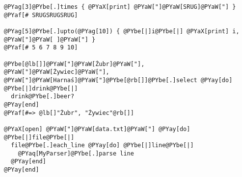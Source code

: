 \begin{Verbatim}[commandchars=@\[\]]
@PYag[3]@PYbe[.]times { @PYaX[print] @PYaW["]@PYaW[SRUG]@PYaW["] }
@PYaf[# SRUGSRUGSRUG]

@PYag[5]@PYbe[.]upto(@PYag[10]) { @PYbe[|]i@PYbe[|] @PYaX[print] i, @PYaW["]@PYaW[ ]@PYaW["] }
@PYaf[# 5 6 7 8 9 10]

@PYbe[@lb[]]@PYaW["]@PYaW[Żubr]@PYaW["], @PYaW["]@PYaW[Żywiec]@PYaW["], @PYaW["]@PYaW[Harnaś]@PYaW["]@PYbe[@rb[]]@PYbe[.]select @PYay[do] @PYbe[|]drink@PYbe[|]
  drink@PYbe[.]beer?
@PYay[end]
@PYaf[#=> @lb[]"Żubr", "Żywiec"@rb[]]

@PYaX[open] @PYaW["]@PYaW[data.txt]@PYaW["] @PYay[do] @PYbe[|]file@PYbe[|]
  file@PYbe[.]each_line @PYay[do] @PYbe[|]line@PYbe[|]
    @PYaq[MyParser]@PYbe[.]parse line
  @PYay[end]
@PYay[end]
\end{Verbatim}
